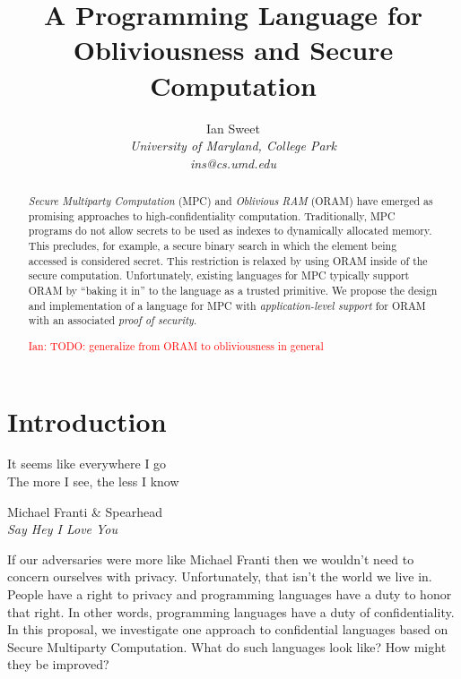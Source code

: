 \documentclass{report}
\newcommand{\ins}[1]{\textcolor{red}{Ian: #1}}
\begin{document}
\title{A Programming Language for Obliviousness and Secure Computation}

\author{Ian Sweet \\
  \emph{University of Maryland, College Park} \\
  \emph{ins@cs.umd.edu}}

\date{}

\maketitle

\begin{abstract}
  \emph{Secure Multiparty Computation} (MPC) and \emph{Oblivious RAM} (ORAM) have emerged as promising approaches to
  high-confidentiality computation. Traditionally, MPC programs do not allow secrets to be used as indexes to dynamically
  allocated memory. This precludes, for example, a secure binary search in which the element being accessed is considered secret.
  This restriction is relaxed by using ORAM inside of the secure computation. Unfortunately, existing languages for MPC typically
  support ORAM by ``baking it in'' to the language as a trusted primitive. We propose the design and implementation of a language
  for MPC with \emph{application-level support} for ORAM with an associated \emph{proof of security}.

  \ins{TODO: generalize from ORAM to obliviousness in general}
\end{abstract}

\tableofcontents

\chapter{Introduction}
\label{ch:intro}

\epigraph{It seems like everywhere I go \\
          The more I see, the less I know}{
            Michael Franti \& Spearhead \\
            \emph{Say Hey I Love You}}

If our adversaries were more like Michael Franti then we wouldn't need to concern ourselves with privacy.
Unfortunately, that isn't the world we live in. People have a right to privacy and programming languages have
a duty to honor that right. In other words, programming languages have a duty of confidentiality. In this proposal,
we investigate one approach to confidential languages based on Secure Multiparty Computation. What do such languages
look like? How might they be improved?
\end{document}

